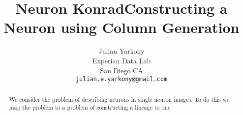 \documentclass{article}
\title{Neuron Konrad}
\title{Constructing a Neuron using Column Generation}
\author{
Julian Yarkony\\
Experian Data Lab \\%
San Diego CA \\
\texttt{julian.e.yarkony@gmail.com} 
}
\begin{document}
%
\maketitle
%
\begin{abstract}
We consider the problem of describing neurons in single neuron images.  To do this we map the problem to a problem of constructing a lineage to one %
%
%
\end{abstract}
\end{document}
